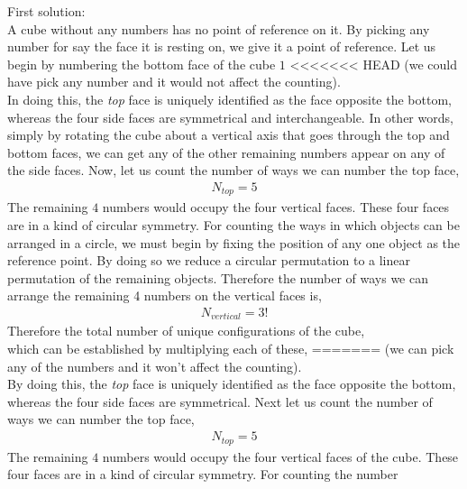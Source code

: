 \fi 

\begin{solution}[\halfpage]
  First solution: \\
  A cube without any numbers has no point of reference on it. By picking
  any number for say the face it is resting on, we give it a point of
  reference. Let us begin by numbering the bottom face of the cube $1$ 
<<<<<<< HEAD
  (we could have pick any number and it would not affect the counting). \\
  In doing this, the \textit{top} face is uniquely identified as the face
  opposite the bottom, whereas the four side faces are symmetrical and
  interchangeable. In other words, simply by rotating the cube about a
  vertical axis that goes through the top and bottom faces, we can get
  any of the other remaining numbers appear on any of the side faces.
  Now, let us count the number of ways we can number the top face,
  \begin{align}
     N_{top} = 5 \nonumber
  \end{align}
  The remaining $4$ numbers would occupy the four vertical faces.
  These four faces are in a kind of circular symmetry. For counting the 
  ways in which objects can be arranged in a circle, we must begin by 
  fixing the position of any one object as the reference point.
  By doing so we reduce a circular permutation to a linear permutation
  of the remaining objects. Therefore the number of ways we can arrange
  the remaining 4 numbers on the vertical faces is,
  \begin{align}
     N_{vertical} = 3! \nonumber
  \end{align}
  Therefore the total number of unique configurations of the cube, \\
  which can be established by multiplying each of these,
=======
  (we can pick any of the numbers and it won't affect the counting). \\
  By doing this, the \textit{top} face is uniquely identified as the face
  opposite the bottom, whereas the four side faces are symmetrical.
  Next let us count the number of ways we can number the top face,
  \begin{align}
     N_{top} = 5 \nonumber
  \end{align}
  The remaining $4$ numbers would occupy the four vertical faces of the cube.
  These four faces are in a kind of circular symmetry. For counting the number

\end{solution}
